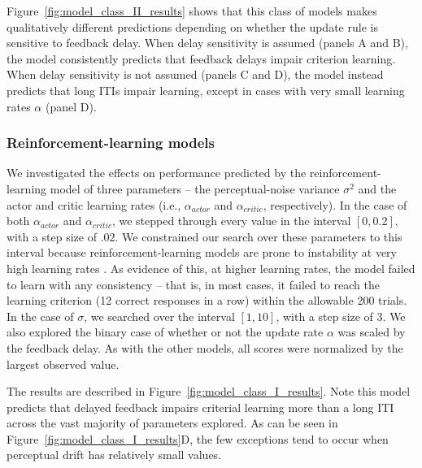 \documentclass[doc, floatsintext]{apa7}
\begin{document}
Figure~\ref{fig:model_class_II_results} shows that this
class of models makes qualitatively different predictions
depending on whether the update rule is sensitive to
feedback delay. When delay sensitivity is assumed (panels A
and B), the model consistently predicts that feedback delays
impair criterion learning. When delay sensitivity is not
assumed (panels C and D), the model instead predicts that
long ITIs impair learning, except in cases with very small
learning rates $\alpha$ (panel D).

\subsubsection{Reinforcement-learning models}
We investigated the effects on performance predicted by the
reinforcement-learning model of three parameters -- the
perceptual-noise variance $\sigma^2$ and the actor and
critic learning rates (i.e., $\alpha_{actor}$ and
$\alpha_{critic}$, respectively). In the case of both
$\alpha_{actor}$ and $\alpha_{critic}$, we stepped through
every value in the interval $[0, 0.2]$, with a step size of
$.02$. We constrained our search over these parameters to this
interval because reinforcement-learning models are prone to
instability at very high learning rates
\parencite{SuttonBarto1998}. As evidence of this, at higher
learning rates, the model failed to learn with any
consistency -- that is, in most cases, it failed to reach
the learning criterion (12 correct responses in a row)
within the allowable 200 trials. In the case of $\sigma$, we
searched over the interval $[1, 10]$, with a step size of
$3$.  We also explored the binary case of whether or not the
update rate $\alpha$ was scaled by the feedback delay. As
with the other models, all scores were normalized by the
largest observed value.

The results are described in
Figure~\ref{fig:model_class_I_results}.  Note this model
predicts that delayed feedback impairs criterial learning
more than a long ITI across the vast majority of parameters
explored. As can be seen in
Figure~\ref{fig:model_class_I_results}D, the few exceptions
tend to occur when perceptual drift has relatively small
values.  
\end{document}
